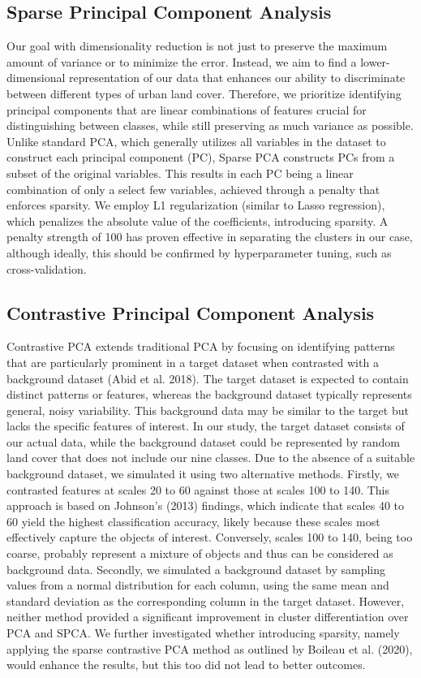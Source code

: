 \documentclass[11pt]{article}
\begin{document}
\subsection{Sparse Principal Component Analysis}
Our goal with dimensionality reduction is not just to preserve the maximum amount of variance or to minimize the error. Instead, we aim to find a lower-dimensional representation of our data that enhances our ability to discriminate between different types of urban land cover. Therefore, we prioritize identifying principal components that are linear combinations of features crucial for distinguishing between classes, while still preserving as much variance as possible. Unlike standard PCA, which generally utilizes all variables in the dataset to construct each principal component (PC), Sparse PCA constructs PCs from a subset of the original variables. This results in each PC being a linear combination of only a select few variables, achieved through a penalty that enforces sparsity. We employ L1 regularization (similar to Lasso regression), which penalizes the absolute value of the coefficients, introducing sparsity. A penalty strength of 100 has proven effective in separating the clusters in our case, although ideally, this should be confirmed by hyperparameter tuning, such as cross-validation.

\subsection{Contrastive Principal Component Analysis}
Contrastive PCA extends traditional PCA by focusing on identifying patterns that are particularly prominent in a target dataset when contrasted with a background dataset (Abid et al. 2018). The target dataset is expected to contain distinct patterns or features, whereas the background dataset typically represents general, noisy variability. This background data may be similar to the target but lacks the specific features of interest. In our study, the target dataset consists of our actual data, while the background dataset could be represented by random land cover that does not include our nine classes. Due to the absence of a suitable background dataset, we simulated it using two alternative methods.
Firstly, we contrasted features at scales 20 to 60 against those at scales 100 to 140. This approach is based on Johnson's (2013) findings, which indicate that scales 40 to 60 yield the highest classification accuracy, likely because these scales most effectively capture the objects of interest. Conversely, scales 100 to 140, being too coarse, probably represent a mixture of objects and thus can be considered as background data. Secondly, we simulated a background dataset by sampling values from a normal distribution for each column, using the same mean and standard deviation as the corresponding column in the target dataset. However, neither method provided a significant improvement in cluster differentiation over PCA and SPCA. We further investigated whether introducing sparsity, namely applying the sparse contrastive PCA method as outlined by Boileau et al. (2020), would enhance the results, but this too did not lead to better outcomes.
\end{document}

